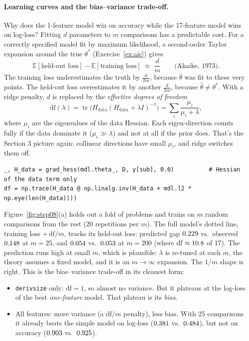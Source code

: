 \documentclass[11pt]{article}
\theoremstyle{definition}
\theoremstyle{plain}
\theoremstyle{remark}
\newcommand{\E}{\mathbb{E}}
\newcommand{\code}[1]{\texttt{#1}}
\renewcommand{\_}{\oldunderscore\allowbreak}
\newcommand{\file}[1]{\textcolor{blue!50!black}{\texttt{#1}}}
\newcommand{\codefrom}[1]{\par\smallskip\noindent{\footnotesize\textbf{From} \file{#1}}}
\begin{document}
\paragraph{Learning curves and the bias--variance trade-off.}
Why does the 1-feature model win on accuracy while the 17-feature model wins on log-loss? Fitting $d$ parameters to $m$ comparisons has a
predictable cost. For a correctly specified model fit by maximum likelihood, a second-order Taylor expansion around the true $\theta^\ast$
(Exercise~\ref{ex:aic}) gives
\[
  \E[\text{held-out loss}]-\E[\text{training loss}]\;\approx\;\frac{d}{m}\qquad\text{(Akaike, 1973)}.
\]
The training loss underestimates the truth by $\frac{d}{2m}$, because $\hat\theta$ was fit to these very points. The held-out loss overestimates it by
another $\frac{d}{2m}$, because $\hat\theta\ne\theta^\ast$. With a ridge penalty, $d$ is replaced by the \emph{effective degrees of freedom}
\[
  \mathrm{df}(\lambda)=\operatorname{tr}\bigl(H_{\text{data}}(H_{\text{data}}+\lambda I)^{-1}\bigr)=\sum_i\frac{\mu_i}{\mu_i+\lambda},
\]
where $\mu_i$ are the eigenvalues of the data Hessian. Each eigen-direction counts fully if the data dominate it ($\mu_i\gg\lambda$) and
not at all if the prior does. That's the Section 3 picture again: collinear directions have small $\mu_i$, and ridge switches them off.
\codefrom{scripts/figs\_step08.py}
\begin{lstlisting}
_, H_data = grad_hess(mdl.theta_, D, y[sub], 0.0)          # Hessian of the data term only
df = np.trace(H_data @ np.linalg.inv(H_data + mdl.l2 * np.eye(len(H_data))))
\end{lstlisting}
Figure~\ref{fig:step08}(a) holds out a fold of problems and trains on $m$ random comparisons from the rest (20 repetitions per $m$). The full model's
dotted line, training loss $+\,\mathrm{df}/m$, tracks its held-out loss: predicted gap $0.229$ vs.\ observed $0.148$ at $m=25$,
and $0.054$ vs.\ $0.053$ at $m=200$ (where $\mathrm{df}\approx10.8$ of 17). The prediction runs high at small $m$,
which is plausible: $\lambda$ is re-tuned at each $m$, the theory assumes a fixed model, and it is an $m\to\infty$ expansion. The $1/m$ shape is right. This is the bias--variance trade-off in its
cleanest form:
\begin{itemize}[nosep]
\item \code{deriv\_size} only: $\mathrm{df}=1$, so almost no variance. But it plateaus at the log-loss of the best \emph{one-feature} model.
  That plateau is its \emph{bias}.
\item All features: more variance (a $\mathrm{df}/m$ penalty), less bias. With 25 comparisons it already beats the simple model on log-loss
  ($0.381$ vs.\ $0.484$), but not on accuracy ($0.903$ vs.\ $0.925$).
\end{itemize}
\end{document}
